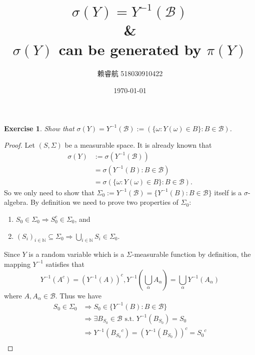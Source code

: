 \documentclass[a4paper, linespread=1.5]{article}
\newtheorem{exercise}[theorem]{Exercise}
\newcommand{\Natural}{\mathbb{N}}
\newcommand{\BorelSet}{\mathcal{B}}
\begin{document}
    \title{$\sigma(Y) = Y^{-1}(\BorelSet)$\\ \& \\ $\sigma(Y)$ can be generated by $\pi(Y)$}
    \author{赖睿航 518030910422}
    \date{\today}
    \maketitle

    \begin{exercise}
        Show that $\sigma(Y) = Y^{-1}(\BorelSet) := (\{\omega \colon Y(\omega) \in B\} \colon B \in \BorelSet)$.
    \end{exercise}

    \begin{proof}
        Let $(S, \Sigma)$ be a measurable space. It is already known that 
        \begin{align*}
            \sigma(Y) &:= \sigma(Y^{-1}(\BorelSet)) \\
            &= \sigma(Y^{-1}(B) \colon B \in \BorelSet) \\
            &= \sigma(\{\omega \colon Y(\omega) \in B\} \colon B \in \BorelSet).
        \end{align*}
        So we only need to show that $\Sigma_0 := Y^{-1}(\BorelSet) = \{Y^{-1}(B) \colon B \in \BorelSet\}$ itself is a $\sigma$-algebra. By definition we need to prove two properties of $\Sigma_0$:
        \begin{enumerate}
            \item $S_0 \in \Sigma_0 \Rightarrow S_0^c \in \Sigma_0$, and
            \item $(S_i)_{i \in \Natural} \subseteq \Sigma_0 \Rightarrow \bigcup_{i \in \Natural}S_i \in \Sigma_0$.
        \end{enumerate}
        Since $Y$ is a random variable which is a $\Sigma$-measurable function by definition, the mapping $Y^{-1}$ satisfies that
        $$
        Y^{-1}(A^c) = (Y^{-1}(A))^c, Y^{-1}(\bigcup_\alpha A_\alpha) = \bigcup_\alpha Y^{-1}(A_\alpha)
        $$
        where $A, A_\alpha \in \BorelSet$. Thus we have
        \begin{align*}
            S_0 \in \Sigma_0 &\Rightarrow S_0 \in \{Y^{-1}(B) \colon B \in \BorelSet\} \\
            &\Rightarrow \exists B_{S_0} \in \BorelSet \textrm{ s.t. } Y^{-1}(B_{S_0}) = S_0 \\
            &\Rightarrow Y^{-1}({B_{S_0}}^c) = (Y^{-1}(B_{S_0}))^c = {S_0}^c \\

\end{align*}
\end{proof}
\end{document}
